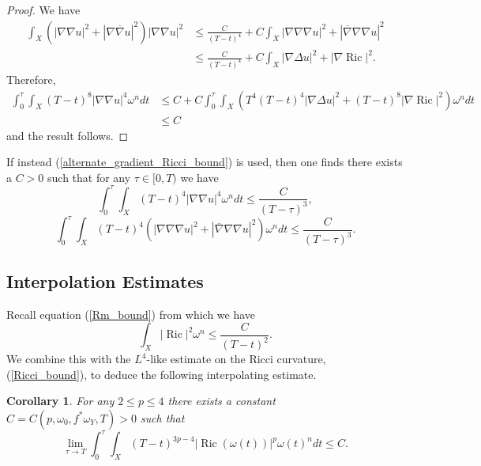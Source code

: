\documentclass[12pt]{article}
\newtheorem{corollary}[theorem]{Corollary}
\numberwithin{equation}{section}
\DeclareMathOperator{\Ric}{Ric}
\newcommand{\oo}[1]{\overline{#1}}
\begin{document}
\begin{proof}
We have
\begin{align*}
    \int_X (|\nabla \nabla u|^2 + |\nabla \oo{\nabla} u|^2)|\nabla \nabla u|^2 &\leq \frac{C}{(T-t)^4} + C \int_X |\nabla \nabla \nabla u|^2 + |\oo{\nabla} \nabla \nabla u|^2\\
    &\leq \frac{C}{(T-t)^4} + C\int_X |\nabla \Delta u|^2 + |\nabla \Ric|^2.
\end{align*}
Therefore, 
\begin{align*}
    \int_0^\tau \int_X (T-t)^8 |\nabla \nabla u|^4 \omega^n dt &\leq C+ C \int_0^\tau \int_X (T^4(T-t)^4|\nabla \Delta u|^2 + (T-t)^8|\nabla \Ric|^2)\omega^n dt\\
    &\leq C
\end{align*}
and the result follows.
\end{proof}

\noindent If instead (\ref{alternate_gradient_Ricci_bound}) is used, then one finds there exists a $C>0$ such that for any $\tau \in [0,T)$ we have
\begin{equation*}
    \int_0^\tau \int_X (T-t)^4|\nabla \nabla u|^4 \omega^ndt \leq \frac{C}{(T-\tau)^3},
\end{equation*}
\begin{equation*}
    \int_0^\tau \int_X (T-t)^4(|\nabla \nabla \nabla u|^2 + |\oo{\nabla} \nabla \nabla u|^2) \omega^n dt \leq \frac{C}{(T-\tau)^3}.
\end{equation*}

\subsection{Interpolation Estimates}

\noindent Recall equation (\ref{Rm_bound}) from which we have
\begin{equation}\label{Good_L2_Ricci_bound}
    \int_X |\Ric|^2 \omega^n \leq \frac{C}{(T-t)^2}.
\end{equation}
We combine this with the $L^4$-like estimate on the Ricci curvature, (\ref{Ricci_bound}), to deduce the following interpolating estimate.


\begin{corollary}
For any $2 \leq p \leq 4$ there exists a constant $C=C(p,\omega_0, f^*\omega_Y, T) > 0$ such that
\begin{equation*}
    \lim_{\tau \to T} \int_0^\tau \int_X (T-t)^{3p-4}|\Ric(\omega(t))|^p \omega(t)^n dt \leq C.
\end{equation*}
\end{corollary}
\end{document}
